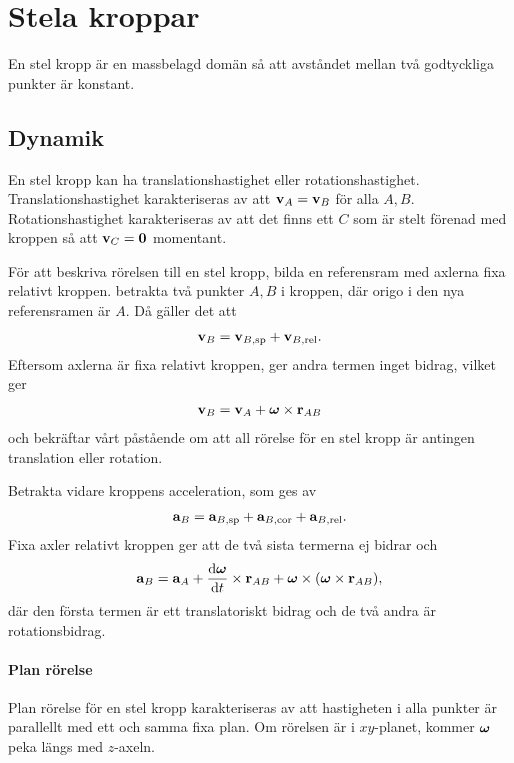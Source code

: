 \section{Stela kroppar}
En stel kropp är en massbelagd domän så att avståndet mellan två godtyckliga punkter är konstant.

\subsection{Dynamik}
En stel kropp kan ha translationshastighet eller rotationshastighet. Translationshastighet karakteriseras av att $\vb{v}_{A} = \vb{v}_{B}$ för alla $A, B$. Rotationshastighet karakteriseras av att det finns ett $C$ som är stelt förenad med kroppen så att $\vb{v}_{C} = \vb{0}$ momentant. 

För att beskriva rörelsen till en stel kropp, bilda en referensram med axlerna fixa relativt kroppen. betrakta två punkter $A, B$ i kroppen, där origo i den nya referensramen är $A$. Då gäller det att
\begin{align*}
	\vb{v}_{B} = \vb{v}_{B, \text{sp}} + \vb{v}_{B, \text{rel}}.
\end{align*}
Eftersom axlerna är fixa relativt kroppen, ger andra termen inget bidrag, vilket ger
\begin{align*}
	\vb{v}_{B} = \vb{v}_{A} + \vb*{\omega}\times\vb{r}_{AB}
\end{align*}
och bekräftar vårt påstående om att all rörelse för en stel kropp är antingen translation eller rotation.

Betrakta vidare kroppens acceleration, som ges av
\begin{align*}
	\vb{a}_{B} = \vb{a}_{B, \text{sp}} + \vb{a}_{B, \text{cor}} + \vb{a}_{B, \text{rel}}.
\end{align*}
Fixa axler relativt kroppen ger att de två sista termerna ej bidrar och
\begin{align*}
	\vb{a}_{B} = \vb{a}_{A} + \dv{\vb*{\omega}}{t}\times\vb{r}_{AB} + \vb*{\omega}\times(\vb*{\omega}\times\vb{r}_{AB}),
\end{align*}
där den första termen är ett translatoriskt bidrag och de två andra är rotationsbidrag.

\paragraph{Plan rörelse}
Plan rörelse för en stel kropp karakteriseras av att hastigheten i alla punkter är parallellt med ett och samma fixa plan. Om rörelsen är i $xy$-planet, kommer $\vb*{\omega}$ peka längs med $z$-axeln.

